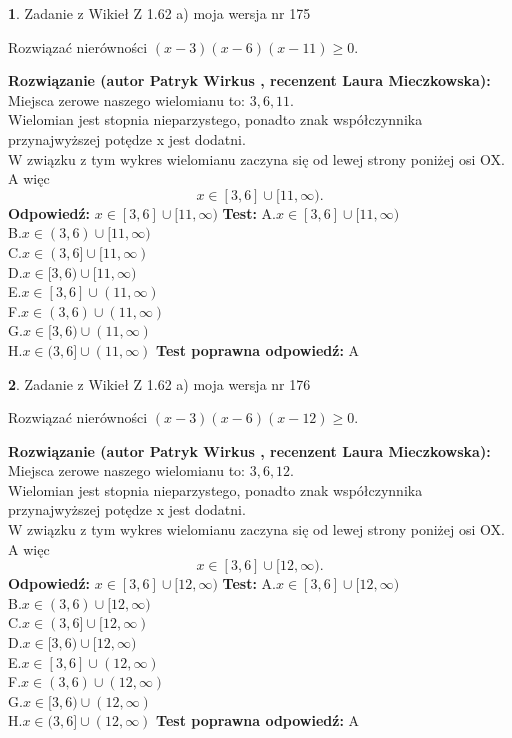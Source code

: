 \documentclass[12pt, a4paper]{article}
\theoremstyle{definition} %
\newtheorem{zad}{}
\newcommand{\zadStart}[1]{\begin{zad}#1\newline}
\newcommand{\zadStop}{\end{zad}}
\newcommand{\rozwStart}[2]{\noindent \textbf{Rozwiązanie (autor #1 , recenzent #2): }\newline}
\newcommand{\rozwStop}{\newline}
\newcommand{\odpStart}{\noindent \textbf{Odpowiedź:}\newline}
\newcommand{\odpStop}{\newline}
\newcommand{\testStart}{\noindent \textbf{Test:}\newline}
\newcommand{\testStop}{\newline}
\newcommand{\kluczStart}{\noindent \textbf{Test poprawna odpowiedź:}\newline}
\newcommand{\kluczStop}{\newline}
\begin{document}
\zadStart{Zadanie z Wikieł Z 1.62 a) moja wersja nr 175}

Rozwiązać nierówności $(x-3)(x-6)(x-11)\ge0$.
\zadStop
\rozwStart{Patryk Wirkus}{Laura Mieczkowska}
Miejsca zerowe naszego wielomianu to: $3, 6, 11$.\\
Wielomian jest stopnia nieparzystego, ponadto znak współczynnika przy\linebreak najwyższej potędze x jest dodatni.\\ W związku z tym wykres wielomianu zaczyna się od lewej strony poniżej osi OX. A więc $$x \in [3,6] \cup [11,\infty).$$
\rozwStop
\odpStart
$x \in [3,6] \cup [11,\infty)$
\odpStop
\testStart
A.$x \in [3,6] \cup [11,\infty)$\\
B.$x \in (3,6) \cup [11,\infty)$\\
C.$x \in (3,6] \cup [11,\infty)$\\
D.$x \in [3,6) \cup [11,\infty)$\\
E.$x \in [3,6] \cup (11,\infty)$\\
F.$x \in (3,6) \cup (11,\infty)$\\
G.$x \in [3,6) \cup (11,\infty)$\\
H.$x \in (3,6] \cup (11,\infty)$
\testStop
\kluczStart
A
\kluczStop



\zadStart{Zadanie z Wikieł Z 1.62 a) moja wersja nr 176}

Rozwiązać nierówności $(x-3)(x-6)(x-12)\ge0$.
\zadStop
\rozwStart{Patryk Wirkus}{Laura Mieczkowska}
Miejsca zerowe naszego wielomianu to: $3, 6, 12$.\\
Wielomian jest stopnia nieparzystego, ponadto znak współczynnika przy\linebreak najwyższej potędze x jest dodatni.\\ W związku z tym wykres wielomianu zaczyna się od lewej strony poniżej osi OX. A więc $$x \in [3,6] \cup [12,\infty).$$
\rozwStop
\odpStart
$x \in [3,6] \cup [12,\infty)$
\odpStop
\testStart
A.$x \in [3,6] \cup [12,\infty)$\\
B.$x \in (3,6) \cup [12,\infty)$\\
C.$x \in (3,6] \cup [12,\infty)$\\
D.$x \in [3,6) \cup [12,\infty)$\\
E.$x \in [3,6] \cup (12,\infty)$\\
F.$x \in (3,6) \cup (12,\infty)$\\
G.$x \in [3,6) \cup (12,\infty)$\\
H.$x \in (3,6] \cup (12,\infty)$
\testStop
\kluczStart
A
\kluczStop
\end{document}
